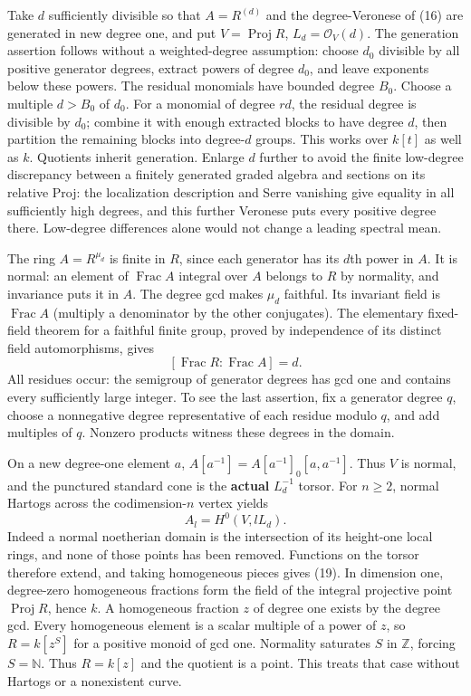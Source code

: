 \documentclass[
  10pt,
]{article}
\begin{document}
Take \(d\) sufficiently divisible so that \(A=R^{(d)}\) and the
degree-Veronese of (16) are generated in new degree one, and put
\(V=\operatorname{Proj}R\), \(L_d=\mathcal O_V(d)\). The generation
assertion follows without a weighted-degree assumption: choose \(d_0\)
divisible by all positive generator degrees, extract powers of degree
\(d_0\), and leave exponents below these powers. The residual monomials
have bounded degree \(B_0\). Choose a multiple \(d>B_0\) of \(d_0\). For
a monomial of degree \(rd\), the residual degree is divisible by
\(d_0\); combine it with enough extracted blocks to have degree \(d\),
then partition the remaining blocks into degree-\(d\) groups. This works
over \(k[t]\) as well as \(k\). Quotients inherit generation. Enlarge
\(d\) further to avoid the finite low-degree discrepancy between a
finitely generated graded algebra and sections on its relative Proj: the
localization description and Serre vanishing give equality in all
sufficiently high degrees, and this further Veronese puts every positive
degree there. Low-degree differences alone would not change a leading
spectral mean.

The ring \(A=R^{\mu_d}\) is finite in \(R\), since each generator has
its \(d\)th power in \(A\). It is normal: an element of
\(\operatorname{Frac}A\) integral over \(A\) belongs to \(R\) by
normality, and invariance puts it in \(A\). The degree gcd makes
\(\mu_d\) faithful. Its invariant field is \(\operatorname{Frac}A\)
(multiply a denominator by the other conjugates). The elementary
fixed-field theorem for a faithful finite group, proved by independence
of its distinct field automorphisms, gives
\[ [\operatorname{Frac}R:\operatorname{Frac}A]=d. \] All residues occur:
the semigroup of generator degrees has gcd one and contains every
sufficiently large integer. To see the last assertion, fix a generator
degree \(q\), choose a nonnegative degree representative of each residue
modulo \(q\), and add multiples of \(q\). Nonzero products witness these
degrees in the domain.

On a new degree-one element \(a\), \(A[a^{-1}]=A[a^{-1}]_0[a,a^{-1}]\).
Thus \(V\) is normal, and the punctured standard cone is the
\textbf{actual} \(L_d^{-1}\) torsor. For \(n\geq2\), normal Hartogs
across the codimension-\(n\) vertex yields
\[ A_l=H^0(V,lL_d).                                                                            \tag{19}\]
Indeed a normal noetherian domain is the intersection of its height-one
local rings, and none of those points has been removed. Functions on the
torsor therefore extend, and taking homogeneous pieces gives (19). In
dimension one, degree-zero homogeneous fractions form the field of the
integral projective point \(\operatorname{Proj}R\), hence \(k\). A
homogeneous fraction \(z\) of degree one exists by the degree gcd. Every
homogeneous element is a scalar multiple of a power of \(z\), so
\(R=k[z^S]\) for a positive monoid of gcd one. Normality saturates \(S\)
in \(\mathbb Z\), forcing \(S=\mathbb N\). Thus \(R=k[z]\) and the
quotient is a point. This treats that case without Hartogs or a
nonexistent curve.
\end{document}
